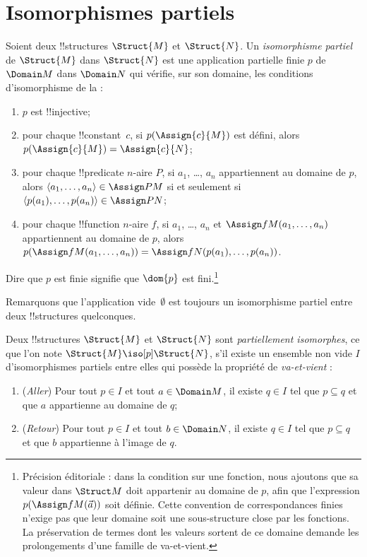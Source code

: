 \documentclass[../../../include/open-logic-section]{subfiles}
\begin{document}
\section{Isomorphismes partiels}

\begin{defn}
  Soient deux !!{structure}s $\Struct{M}$ et $\Struct{N}$.
  Un \emph{isomorphisme partiel} de $\Struct{M}$ dans $\Struct{N}$
  est une application partielle finie $p$ de $\Domain M$ dans
  $\Domain N$ qui vérifie, sur son domaine, les conditions
  d'isomorphisme de la  :
  \begin{enumerate}
  \item $p$ est !!{injective};
  \item pour chaque !!{constant}~$c$, si $p(\Assign{c}{M})$ est défini,
    alors $p(\Assign{c}{M}) = \Assign{c}{N}$;
  \item pour chaque !!{predicate} $n$-aire $P$, si $a_1$, \dots, $a_n$
    appartiennent au domaine de $p$, alors
    $\langle a_1, \dots, a_n\rangle \in \Assign P M$ si et seulement
    si $\langle p(a_1), \dots, p(a_n) \rangle \in \Assign P N$;
  \item pour chaque !!{function} $n$-aire $f$, si $a_1$, \dots, $a_n$
    et $\Assign f M (a_1, \dots,a_n)$ appartiennent au domaine de $p$,
    alors $p(\Assign f M (a_1, \dots,a_n))
    = \Assign f N (p(a_1), \dots, p(a_n))$.
  \end{enumerate}
  Dire que $p$ est finie signifie que $\dom{p}$ est fini.\footnote{Précision éditoriale : dans la condition sur une fonction, nous ajoutons que sa valeur dans $\Struct M$ doit appartenir au domaine de $p$, afin que l'expression $p(\Assign f M(\vec a))$ soit définie. Cette convention de correspondances finies n'exige pas que leur domaine soit une sous-structure close par les fonctions. La préservation de termes dont les valeurs sortent de ce domaine demande les prolongements d'une famille de va-et-vient.}
\end{defn}

Remarquons que l'application vide~$\emptyset$ est toujours un
isomorphisme partiel entre deux !!{structure}s quelconques.

\begin{defn}
  Deux !!{structure}s $\Struct{M}$ et $\Struct{N}$ sont
  \emph{partiellement isomorphes}, ce que l'on note
  $\Struct{M} \iso[p] \Struct{N}$, s'il existe un ensemble non vide
  $I$ d'isomorphismes partiels entre elles qui possède la propriété
  de \emph{va-et-vient} :
  \begin{enumerate}
  \item (\emph{Aller}) Pour tout $p \in I$ et tout
    $a \in \Domain M$, il existe $q \in I$ tel que $p \subseteq q$
    et que $a$ appartienne au domaine de $q$;
  \item (\emph{Retour}) Pour tout $p \in I$ et tout
    $b \in \Domain N$, il existe $q \in I$ tel que $p \subseteq q$
    et que $b$ appartienne à l'image de $q$.
  \end{enumerate}
\end{defn}
\end{document}
